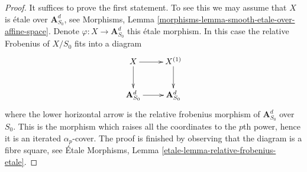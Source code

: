 \documentclass[10pt,a4paper]{amsart}
\theoremstyle{plain}
\theoremstyle{definition}
\theoremstyle{remark}
\numberwithin{equation}{subsection}
\begin{document}
\begin{proof}
It suffices to prove the first statement. To see this we may assume
that $X$ is \'etale over $\mathbf{A}^d_{S_0}$, see
Morphisms, Lemma \ref{morphisms-lemma-smooth-etale-over-affine-space}.
Denote $\varphi : X \to \mathbf{A}^d_{S_0}$ this \'etale morphism.
In this case the relative Frobenius of $X/S_0$ fits into a diagram
$$
\xymatrix{
X \ar[d] \ar[r] & X^{(1)} \ar[d] \\
\mathbf{A}^d_{S_0} \ar[r] & \mathbf{A}^d_{S_0}
}
$$
where the lower horizontal arrow is the relative frobenius morphism
of $\mathbf{A}^d_{S_0}$ over $S_0$. This is the morphism which raises
all the coordinates to the $p$th power, hence it is an iterated
$\alpha_p$-cover. The proof is finished by observing that the diagram
is a fibre square, see
\'Etale Morphisms, Lemma \ref{etale-lemma-relative-frobenius-etale}.
\end{proof}
\end{document}
